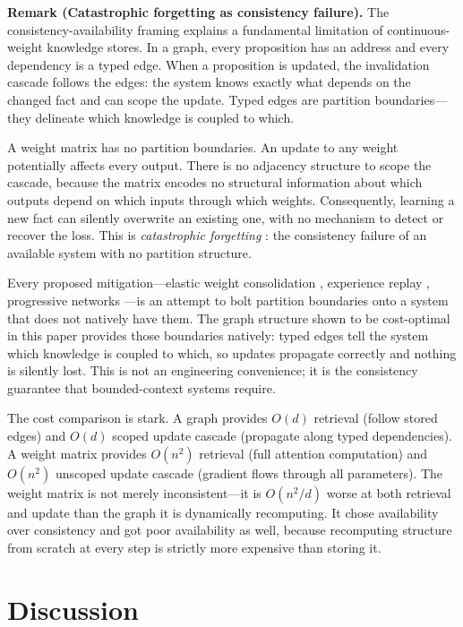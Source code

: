 \documentclass[11pt]{article}
\theoremstyle{definition}
\begin{document}
\textbf{Remark (Catastrophic forgetting as consistency failure).}
The consistency-availability framing explains a fundamental limitation
of continuous-weight knowledge stores. In a graph, every proposition
has an address and every dependency is a typed edge. When a proposition
is updated, the invalidation cascade follows the edges: the system
knows exactly what depends on the changed fact and can scope the
update. Typed edges are partition boundaries---they delineate which
knowledge is coupled to which.

A weight matrix has no partition boundaries. An update to any weight
potentially affects every output. There is no adjacency structure to
scope the cascade, because the matrix encodes no structural information
about which outputs depend on which inputs through which weights.
Consequently, learning a new fact can silently overwrite an existing
one, with no mechanism to detect or recover the loss. This is
\emph{catastrophic forgetting} \cite{McCloskey1989, Kirkpatrick2017}:
the consistency failure of an available system with no partition
structure.

Every proposed mitigation---elastic weight consolidation
\cite{Kirkpatrick2017}, experience replay \cite{Rolnick2019},
progressive networks \cite{Rusu2016}---is an attempt to bolt partition
boundaries onto a system that does not natively have them.
The graph structure shown to be cost-optimal in this paper provides those
boundaries natively: typed edges tell the system which knowledge
is coupled to which, so updates propagate correctly and nothing is
silently lost. This is not an engineering convenience; it is the
consistency guarantee that bounded-context systems require.

The cost comparison is stark. A graph provides $O(d)$ retrieval
(follow stored edges) and $O(d)$ scoped update cascade (propagate
along typed dependencies). A weight matrix provides $O(n^2)$
retrieval (full attention computation) and $O(n^2)$ unscoped update
cascade (gradient flows through all parameters). The weight matrix
is not merely inconsistent---it is $O(n^2/d)$ worse at both
retrieval and update than the graph it is dynamically recomputing.
It chose availability over consistency and got poor availability as
well, because recomputing structure from scratch at every step is
strictly more expensive than storing it.

\section{Discussion}
\label{sec:discussion}
\end{document}
